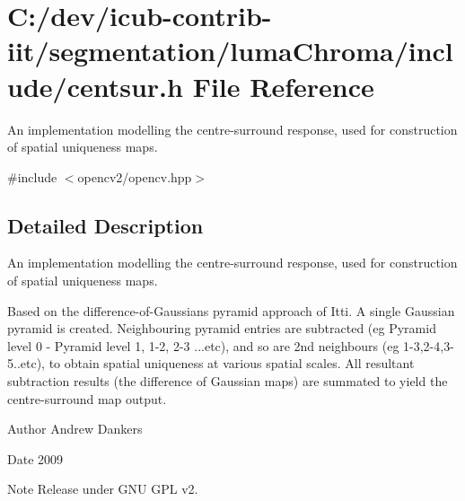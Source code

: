 \section{C\+:/dev/icub-\/contrib-\/iit/segmentation/luma\+Chroma/include/centsur.h File Reference}
\label{centsur_8h}


An implementation modelling the centre-\/surround response, used for construction of spatial uniqueness maps.  


{\ttfamily \#include $<$opencv2/opencv.\+hpp$>$}\newline


\subsection{Detailed Description}
An implementation modelling the centre-\/surround response, used for construction of spatial uniqueness maps. 

Based on the difference-\/of-\/\+Gaussians pyramid approach of Itti. A single Gaussian pyramid is created. Neighbouring pyramid entries are subtracted (eg Pyramid level 0 -\/ Pyramid level 1, 1-\/2, 2-\/3 ...etc), and so are 2nd neighbours (eg 1-\/3,2-\/4,3-\/5..etc), to obtain spatial uniqueness at various spatial scales. All resultant subtraction results (the difference of Gaussian maps) are summated to yield the centre-\/surround map output.

\begin{DoxyAuthor}{Author}
Andrew Dankers 
\end{DoxyAuthor}
\begin{DoxyDate}{Date}
2009 
\end{DoxyDate}
\begin{DoxyNote}{Note}
Release under G\+NU G\+PL v2. 
\end{DoxyNote}
